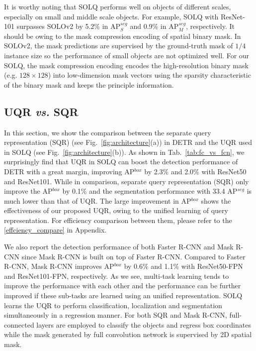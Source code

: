 \documentclass{article}
\begin{document}
It is worthy noting that SOLQ performs well on objects of different scales, especially on small and middle scale objects. For example, SOLQ with ResNet-101 surpasses SOLOv2 by 5.2\% in AP$^{seg}_{S}$ and 0.9\% in AP$^{seg}_{M}$, respectively. It should be owing to the mask compression encoding of spatial binary mask. In SOLOv2, the mask predictions are supervised by the ground-truth mask of $1/4$ instance size so the performance of small objects are not optimized well. For our SOLQ, the mask compression encoding encodes the high-resolution binary mask (e.g. $128\times128$) into low-dimension mask vectors using the sparsity characteristic of the binary mask and keeps the principle information. 

\subsection{UQR \textit{vs.} SQR}
\label{uqr_vs_sqr}
In this section, we show the comparison between the separate query representation (SQR) (see Fig.~\ref{fig:architecture}(a)) in DETR and the UQR used in SOLQ (see Fig.~\ref{fig:architecture}(b)). As shown in Tab.~\ref{tab:fc_vs_fcn}, we surprisingly find that UQR in SOLQ can boost the detection performance of DETR with a great margin, improving AP$^{box}$ by 2.3\% and 2.0\% with ResNet50 and ResNet101. While in comparison, separate query representation (SQR) only improve the AP$^{box}$ by 0.1\% and the segmentation performance with 33.4 AP$^{seg}$ is much lower than that of UQR. The large improvement in AP$^{box}$ shows the effectiveness of our proposed UQR, owing to the unified learning of query representation. For efficiency comparison between them, please refer to the \ref{effciency_compare} in Appendix.

We also report the detection performance of both Faster R-CNN and Mask R-CNN since Mask R-CNN is built on top of Faster R-CNN. Compared to Faster R-CNN, Mask R-CNN improves AP$^{box}$ by 0.6\% and 1.1\% with ResNet50-FPN and ResNet101-FPN, respectively. As we see, multi-task learning tends to improve the performance with each other and the performance can be further improved if these sub-tasks are learned using an unified representation. SOLQ learns the UQR to perform  classification, localization and segmentation simultaneously in a regression manner. For both SQR and Mask R-CNN, full-connected layers are employed to classify the objects and regress box coordinates while the mask generated by full convolution network is supervised by 2D spatial mask.
\end{document}
